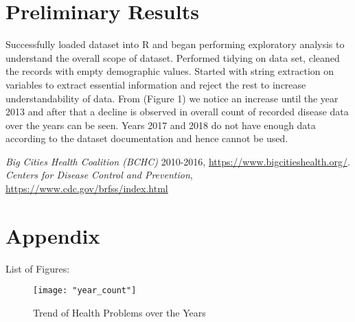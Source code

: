 \documentclass[11pt]{article}
\begin{document}
  \section{Preliminary Results}
  Successfully loaded dataset into R and began performing exploratory analysis to understand the overall scope of dataset.
  Performed tidying on data set, cleaned the records with empty demographic values. Started with string extraction on variables to extract essential information and reject the rest to increase understandability of data. From (Figure 1) we notice an increase until the year 2013 and after that a decline is observed in overall count of recorded disease data over the years can be seen. Years 2017 and 2018 do not have enough data according to the dataset documentation and hence cannot be used.

  \newpage
  \begin{thebibliography}{9}
    \bibitem[1]{} \emph{Big Cities Health Coalition (BCHC)} 2010-2016,
    \url{https://www.bigcitieshealth.org/}. 
    \bibitem[2]{} \emph{Centers for Disease Control and Prevention},
    \url{https://www.cdc.gov/brfss/index.html}
  \end{thebibliography}

  \section*{Appendix}
  
  List of Figures:
  
  \begin{figure}[H]
    \centering
    \texttt{[image: "year\_count"]}
    \caption{Trend of Health Problems over the Years}
  \end{figure}
\end{document}
